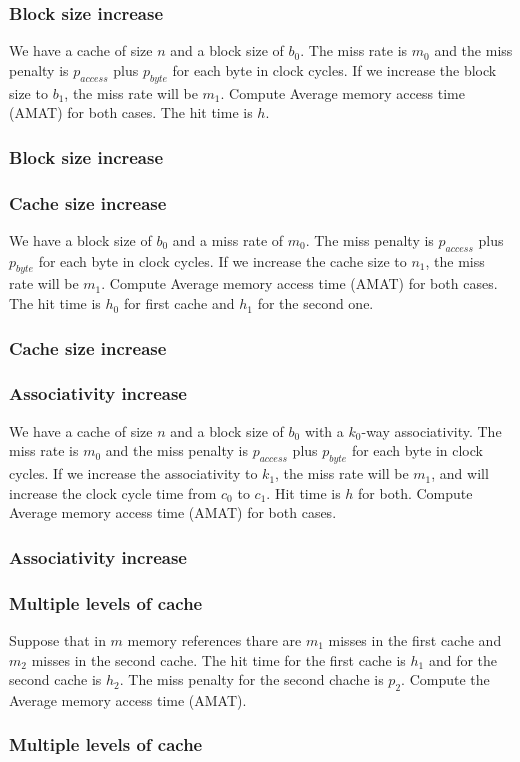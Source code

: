 \begin{frame}
    \frametitle{Block size increase}
    We have a cache of size $n$ and a block size of $b_{0}$.
    The miss rate is $m_{0}$ and the miss penalty is $p_{access}$ plus $p_{byte}$
    for each byte in clock cycles. If we increase the block size to $b_{1}$,
    the miss rate will be $m_{1}$. Compute Average memory access time (AMAT)
    for both cases. The hit time is $h$.
\end{frame}
\begin{frame}
    \frametitle{Block size increase}
\end{frame}


\begin{frame}
    \frametitle{Cache size increase}
    We have a block size of $b_{0}$ and a miss rate of $m_{0}$.
    The miss penalty is $p_{access}$ plus $p_{byte}$ for each byte in clock cycles.
    If we increase the cache size to $n_{1}$, the miss rate will be $m_{1}$.
    Compute Average memory access time (AMAT) for both cases.
    The hit time is $h_{0}$ for first cache and $h_{1}$ for the second one.
\end{frame}
\begin{frame}
    \frametitle{Cache size increase}
\end{frame}

\begin{frame}
    \frametitle{Associativity increase}
    We have a cache of size $n$ and a block size of $b_{0}$ with a $k_{0}$-way associativity.
    The miss rate is $m_{0}$ and the miss penalty is $p_{access}$ plus $p_{byte}$ for
    each byte in clock cycles. If we increase the associativity to $k_{1}$,
    the miss rate will be $m_{1}$, and will increase the clock cycle time from $c_{0}$ to $c_{1}$.
    Hit time is $h$ for both. Compute Average memory access time (AMAT) for both cases.
\end{frame}
\begin{frame}
    \frametitle{Associativity increase}
\end{frame}

\begin{frame}
    \frametitle{Multiple levels of cache}
    Suppose that in $m$ memory references thare are $m_{1}$ misses in the first cache and $m_{2}$ misses in the second cache.
    The hit time for the first cache is $h_{1}$ and for the second cache is $h_{2}$.
    The miss penalty for the second chache is $p_{2}$.
    Compute the Average memory access time (AMAT).
\end{frame}
\begin{frame}
    \frametitle{Multiple levels of cache}
\end{frame}